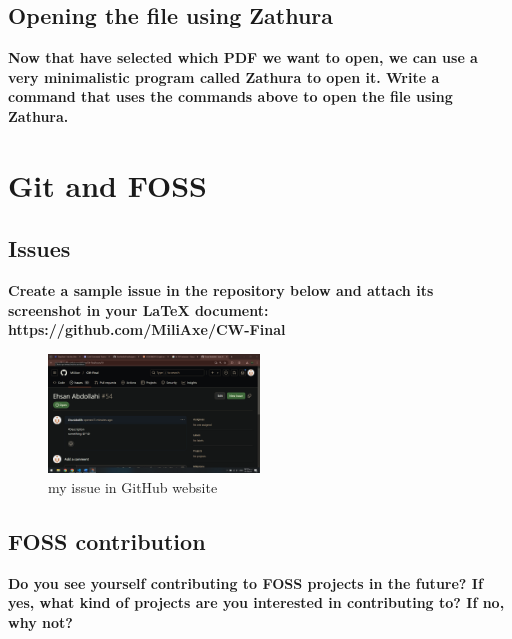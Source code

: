 \documentclass{article}
\begin{document}
\subsection{Opening the file using Zathura}
\textbf{Now that have selected which PDF we want to open, we can use a very minimalistic program called Zathura to open it. Write a command that uses the commands above to open the file using Zathura.}

\section{Git and FOSS}
\subsection{Issues}
\textbf{Create a sample issue in the repository below and attach its screenshot in your LaTeX document: https://github.com/MiliAxe/CW-Final}
\begin{figure}[h]
    \centering
    \includegraphics[width=0.5\textwidth]{Screenshot.png}
    \caption{my issue in GitHub website}
    \label{fig:my_image}
\end{figure}
\subsection{FOSS contribution}
\textbf{Do you see yourself contributing to FOSS projects in the future? If yes, what kind of projects are you interested in contributing to? If no, why not?}
\end{document}
